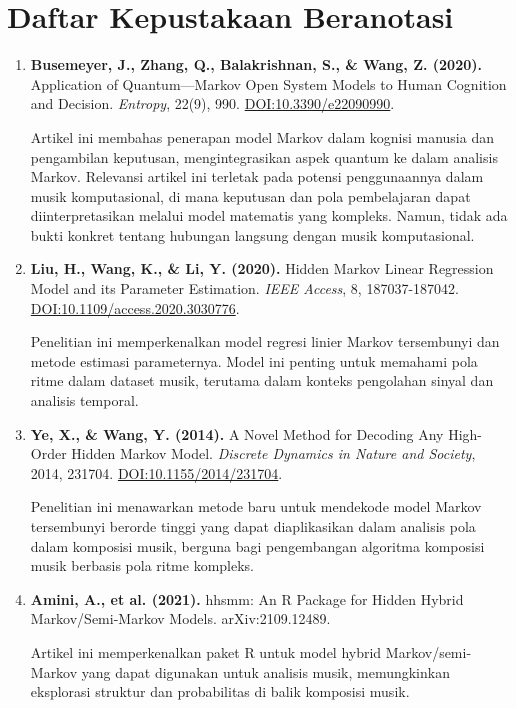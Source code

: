 \documentclass[a4paper,12pt]{article}
\begin{document}
\section*{Daftar Kepustakaan Beranotasi}
\begin{enumerate}
    \item \textbf{Busemeyer, J., Zhang, Q., Balakrishnan, S., \& Wang, Z. (2020).} Application of Quantum—Markov Open System Models to Human Cognition and Decision. \textit{Entropy}, 22(9), 990. \href{https://doi.org/10.3390/e22090990}{DOI:10.3390/e22090990}.\par
    Artikel ini membahas penerapan model Markov dalam kognisi manusia dan pengambilan keputusan, mengintegrasikan aspek quantum ke dalam analisis Markov. Relevansi artikel ini terletak pada potensi penggunaannya dalam musik komputasional, di mana keputusan dan pola pembelajaran dapat diinterpretasikan melalui model matematis yang kompleks. Namun, tidak ada bukti konkret tentang hubungan langsung dengan musik komputasional.

    \item \textbf{Liu, H., Wang, K., \& Li, Y. (2020).} Hidden Markov Linear Regression Model and its Parameter Estimation. \textit{IEEE Access}, 8, 187037-187042. \href{https://doi.org/10.1109/access.2020.3030776}{DOI:10.1109/access.2020.3030776}.\par
    Penelitian ini memperkenalkan model regresi linier Markov tersembunyi dan metode estimasi parameternya. Model ini penting untuk memahami pola ritme dalam dataset musik, terutama dalam konteks pengolahan sinyal dan analisis temporal.

    \item \textbf{Ye, X., \& Wang, Y. (2014).} A Novel Method for Decoding Any High-Order Hidden Markov Model. \textit{Discrete Dynamics in Nature and Society}, 2014, 231704. \href{https://doi.org/10.1155/2014/231704}{DOI:10.1155/2014/231704}.\par
    Penelitian ini menawarkan metode baru untuk mendekode model Markov tersembunyi berorde tinggi yang dapat diaplikasikan dalam analisis pola dalam komposisi musik, berguna bagi pengembangan algoritma komposisi musik berbasis pola ritme kompleks.

    \item \textbf{Amini, A., et al. (2021).} hhsmm: An R Package for Hidden Hybrid Markov/Semi-Markov Models. arXiv:2109.12489.\par
    Artikel ini memperkenalkan paket R untuk model hybrid Markov/semi-Markov yang dapat digunakan untuk analisis musik, memungkinkan eksplorasi struktur dan probabilitas di balik komposisi musik.


\end{enumerate}
\end{document}
